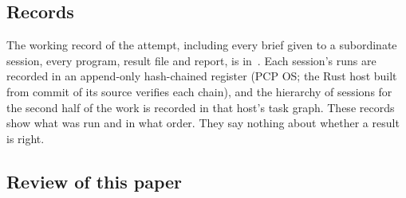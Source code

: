 \subsection{Records}
The working record of the attempt, including every brief given to a subordinate session, every program, result file and report, is in~\cite{Repo}. Each session's runs are recorded in an append-only hash-chained register (PCP OS; the Rust host built from commit  of its source verifies each chain), and the hierarchy of sessions for the second half of the work is recorded in that host's task graph. These records show what was run and in what order. They say nothing about whether a result is right.

\subsection{Review of this paper}\label{sec:paperreview}

